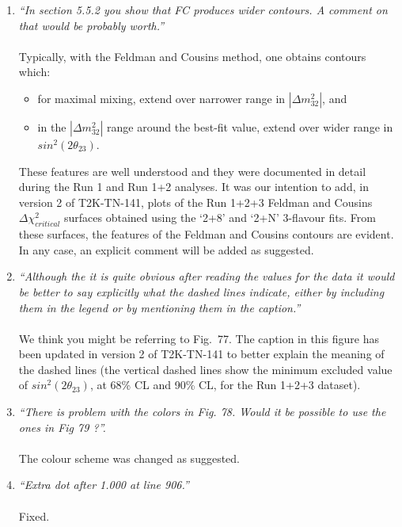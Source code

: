 \begin{enumerate}
\vspace{5 mm}
\item
{\em
  ``In section 5.5.2 you show that FC produces wider contours. A comment on that would be probably worth.''
}\\
\\
Typically, with the Feldman and Cousins method, one obtains contours which: 
\begin{itemize}
\item
for maximal mixing, extend over narrower range in $|\Delta m^2_{32}|$, and
\item
in the $|\Delta m^2_{32}|$ range around the best-fit value, extend over wider range
in $sin^{2}(2\theta_{23})$.
\end{itemize}

These features are well understood and they were documented in detail during the Run 1 and Run 1+2 analyses.
It was our intention to add, in version 2 of T2K-TN-141, 
plots of the Run 1+2+3 Feldman and Cousins $\Delta\chi^{2}_{critical}$ surfaces
obtained using the `2+8' and `2+N' 3-flavour fits.
From these surfaces, the features of the  Feldman and Cousins contours are evident.
In any case, an explicit comment will be added as suggested.

\vspace{5 mm}
\item
{\em
  ``Although the it is quite obvious after reading the values for the data it would be better to 
    say explicitly what the dashed lines indicate, either by including them in the 
    legend or by mentioning them in the caption.''
}\\
\\
We think you might be referring to Fig.\ 77. The caption in this figure has been updated in version 2 of 
T2K-TN-141 to better explain the meaning of the dashed lines (the vertical dashed lines show the
minimum excluded value of $sin^{2}(2\theta_{23})$, at 68\% CL and 90\% CL, for the Run 1+2+3 dataset).

\vspace{5 mm}
\item
{\em
  ``There is problem with the colors in Fig. 78. Would it be possible to use the ones in Fig 79 ?''.
}\\
\\
The colour scheme was changed as suggested.

\vspace{5 mm}
\item
{\em
  ``Extra dot after 1.000 at line 906.''
}\\
\\
Fixed.


\end{enumerate}
